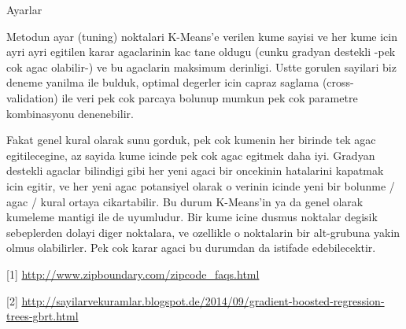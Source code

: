\documentclass[12pt,fleqn]{article}\usepackage{../common}
\begin{document}
Ayarlar

Metodun ayar (tuning) noktalari K-Means'e verilen kume sayisi ve her kume
icin ayri ayri egitilen karar agaclarinin kac tane oldugu (cunku gradyan
destekli -pek cok agac olabilir-) ve bu agaclarin maksimum derinligi. Ustte
gorulen sayilari biz deneme yanilma ile bulduk, optimal degerler icin
capraz saglama (cross-validation) ile veri pek cok parcaya bolunup mumkun
pek cok parametre kombinasyonu denenebilir.

Fakat genel kural olarak sunu gorduk, pek cok kumenin her birinde tek agac
egitilecegine, az sayida kume icinde pek cok agac egitmek daha iyi. Gradyan
destekli agaclar bilindigi gibi her yeni agaci bir oncekinin hatalarini
kapatmak icin egitir, ve her yeni agac potansiyel olarak o verinin icinde
yeni bir bolunme / agac / kural ortaya cikartabilir. Bu durum K-Means'in ya
da genel olarak kumeleme mantigi ile de uyumludur. Bir kume icine dusmus
noktalar degisik sebeplerden dolayi diger noktalara, ve ozellikle o
noktalarin bir alt-grubuna yakin olmus olabilirler. Pek cok karar agaci bu
durumdan da istifade edebilecektir. 

[1] \url{http://www.zipboundary.com/zipcode_faqs.html}

[2] \url{http://sayilarvekuramlar.blogspot.de/2014/09/gradient-boosted-regression-trees-gbrt.html}
\end{document}
